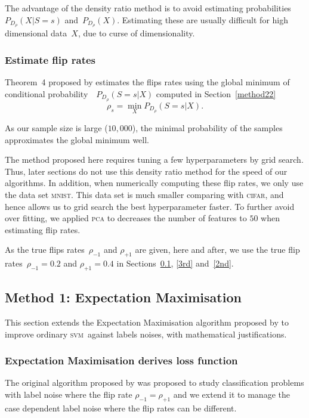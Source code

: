 \documentclass[12pt]{article} %
\newcommand{\svm}{\textsc{svm}}
\newcommand{\rhoo}{\rho_{+1}}
\newcommand{\rhoz}{\rho_{-1}}
\begin{document}
The advantage of the density ratio method is to avoid estimating probabilities~${P_{D_\rho}(X|S=s)}$ and~${P_{D_\rho}(X)}$. Estimating these are usually difficult for high dimensional data~$X$, due to curse of dimensionality. 


\subsubsection{Estimate flip rates}\label{method23}
Theorem~4 proposed by \citet{liu2016classification} estimates the flips rates using the global minimum of conditional probability~~$P_{D_\rho}(S=s|X)$ computed in Section~\ref{method22}
\begin{equation*}\label{eq:fliprate}
\rho_s=\min _X P_{D_\rho}(S=s|X).
\end{equation*}

As our sample size is large ($10,000$), the minimal probability of the samples approximates the global minimum well. 

The method proposed here requires tuning a few hyperparameters by grid search. Thus, later sections do not use this density ratio method for the speed of our algorithms.  
In addition, when numerically computing these flip rates, we only use the data set \textsc{mnist}. This data set is much smaller comparing with \textsc{cifar}, and hence allows us to grid search the best hyperparameter faster. To further avoid over fitting, we applied \textsc{pca} to decreases the number of features to $50$ when estimating flip rates.

As the true flips rates~$\rhoz$ and $\rhoo$ are given, here and after, we use the true flip rates~$\rhoz=0.2$ and $\rhoo=0.4$ in Sections~\ref{1st}, \ref{3rd} and~\ref{2nd}.


\subsection{Method 1: Expectation Maximisation}\label{1st}
This section extends the Expectation Maximisation algorithm proposed by \citet{pmlr-v20-biggio11} to improve ordinary \svm\ against labels noises, with mathematical justifications.
\subsubsection{Expectation Maximisation derives loss function}
The original algorithm proposed by \citet{pmlr-v20-biggio11} was proposed to study classification problems with label noise where the flip rate $\rhoz=\rhoo$ and we extend it to manage the case dependent label noise where the flip rates can be different.
\end{document}
